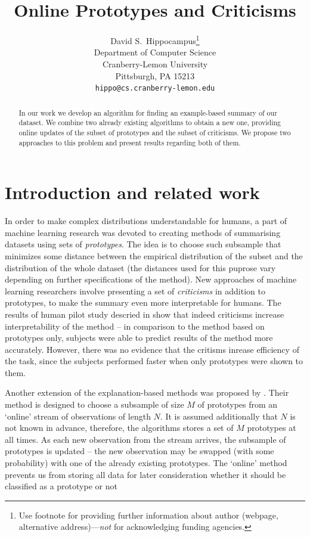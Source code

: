 \documentclass{article}
\title{Online Prototypes and Criticisms}
\author{
	David S.~Hippocampus\thanks{Use footnote for providing further
		information about author (webpage, alternative
		address)---\emph{not} for acknowledging funding agencies.} \\
	Department of Computer Science\\
	Cranberry-Lemon University\\
	Pittsburgh, PA 15213 \\
	\texttt{hippo@cs.cranberry-lemon.edu} \\
}
\begin{document}
	
	\maketitle
	
	\begin{abstract}
		In our work we develop an algorithm for finding an example-based summary of our dataset. We combine two already existing algorithms to obtain a new one, providing online updates of the  subset of prototypes and  the subset of criticisms. We propose two approaches to this problem and present results regarding both of them.
	\end{abstract}
	
	\section{Introduction and related work}
	
	
	In order to make complex distributions understandable for humans, a part of machine learning research was devoted to creating methods of summarising datasets using sets of \textit{prototypes}. The idea is to choose such subsample that minimizes some distance between the empirical distribution of the  subset and the distribution of the whole dataset (the distances used for this puprose vary depending on further specifications of the method). New approaches of machine learning researchers \cite{kim} involve presenting a set of \textit{criticisms} in addition to prototypes, to make the summary even more interpretable for humans. The results of human pilot study descried in \cite{kim} show that indeed  criticisms increase interpretability of the method -- in comparison to the method based on prototypes only, subjects were able to predict results of the method more accurately. However, there was no evidence that the critisms inrease efficiency of the task, since the subjects performed faster when only prototypes were shown to them.
	
	Another extension of the explanation-based methods was proposed by \cite{kim}. Their method is designed to choose a subsample  of size $M$ of prototypes from an `online' stream of observations of length $N$. It is assumed additionally that $N$ is not known in advance, therefore, the algorithms stores a set of $M$ prototypes at all times. As each new observation from the stream arrives, the subsample of prototypes is updated -- the new observation may be swapped (with some probability) with one of the already existing prototypes. The `online' method prevents us from storing all data for later consideration whether it should be classified as a prototype or not
	
\end{document}
